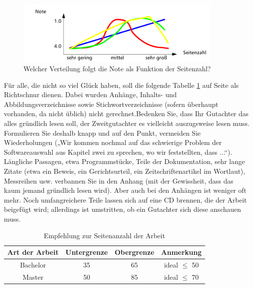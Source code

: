\begin{figure}[htb]
  \centering
  \includegraphics[width=0.9\textwidth]{figures/note_page.png}
  \caption[Verteilung: Seitenanzahl-Note]{Welcher Verteilung folgt die Note als Funktion der Seitenzahl?}
  \label{fig:graph}
\end{figure}

Für alle, die nicht so viel Glück haben, soll die folgende Tabelle \ref{tab:tabelle-2} auf Seite \pageref{tab:tabelle-2} als Richtschnur
dienen. Dabei wurden Anhänge, Inhalts- und Abbildungsverzeichnisse sowie Stichwortverzeichnisse (sofern überhaupt vorhanden, da nicht üblich) nicht gerechnet.Bedenken Sie, dass Ihr Gutachter das alles gründlich lesen soll, der Zweitgutachter es vielleicht
auszugsweise lesen muss. Formulieren Sie deshalb knapp und auf den Punkt, vermeiden Sie Wiederholungen („Wir kommen nochmal auf das schwierige Problem der Softwareauswahl aus
Kapitel zwei zu sprechen, wo wir feststellten, dass ...“).
Längliche Passagen, etwa Programmstücke, Teile der Dokumentation, sehr lange Zitate (etwa ein Beweis, ein Gerichtsurteil, ein Zeitschriftenartikel im Wortlaut), Messreihen usw.
verbannen Sie in den Anhang (mit der Gewissheit, dass das kaum jemand gründlich lesen wird).
Aber auch bei den Anhängen ist weniger oft mehr. Noch umfangreichere Teile lassen sich auf
eine CD brennen, die der Arbeit beigefügt wird; allerdings ist umstritten, ob ein Gutachter sich
diese anschauen muss.

\begin{table}[tb]
  \centering
  \begin{tabular}{cccc}
    \toprule
    \textbf{Art der Arbeit} & \textbf{Untergrenze} & \textbf{Obergrenze} & \textbf{Anmerkung} \\
		\midrule
    Bachelor & 35 & 65 & ideal $\leq$ 50 \\
    Master & 50 & 85 & ideal $\leq$ 70 \\
    \bottomrule
  \end{tabular}
  \caption{Empfehlung zur Seitenanzahl der Arbeit}
  \label{tab:tabelle-2}
\end{table}


